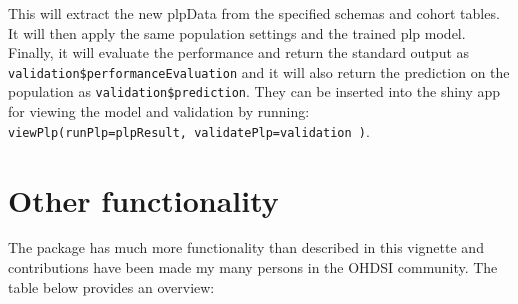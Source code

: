 \documentclass[
]{article}
\begin{document}
This will extract the new plpData from the specified schemas and cohort
tables. It will then apply the same population settings and the trained
plp model. Finally, it will evaluate the performance and return the
standard output as \texttt{validation\$performanceEvaluation} and it
will also return the prediction on the population as
\texttt{validation\$prediction}. They can be inserted into the shiny app
for viewing the model and validation by running:
\texttt{viewPlp(runPlp=plpResult,\ validatePlp=validation\ )}.

\newpage

\hypertarget{other-functionality}{%
\section{Other functionality}\label{other-functionality}}

The package has much more functionality than described in this vignette
and contributions have been made my many persons in the OHDSI community.
The table below provides an overview:
\end{document}

